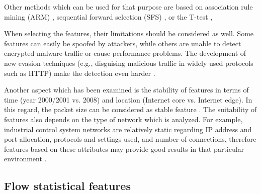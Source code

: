 \documentclass[conference]{IEEEtran}
\begin{document}
Other methods which can be used for that purpose are based on association rule mining (ARM) \cite{moustafa2015}, sequential forward selection (SFS) \cite{dehghani2010} \cite{xu2015}, or the T-test \cite{sopuru2019}, 

When selecting the features, their limitations should be considered as well. Some features can easily be spoofed by attackers, while others are unable to detect encrypted malware traffic or cause performance problems. The development of new evasion techniques (e.g., disguising malicious traffic in widely used protocols such as HTTP) make the detection even harder \cite{celik2015}.

Another aspect which has been examined is the stability of features in terms of time (year 2000/2001 vs. 2008) and location (Internet core vs. Internet edge). In this regard, the packet size can be considered as stable feature \cite{este2009}. The suitability of features also depends on the type of network which is analyzed. For example, industrial control system networks are relatively static regarding IP address and port allocation, protocols and settings used, and number of connections, therefore features based on these attributes may provide good results in that particular environment \cite{mantere2013}.

\subsection{Flow statistical features}
\end{document}
